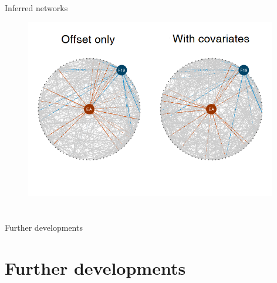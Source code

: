 \documentclass[9pt]{beamer}
\newcommand{\bleu}[1]{\textcolor{Framableulight}{#1}}
\begin{document}
\begin{frame}{Inferred networks}
\begin{figure}[htp]
\centering
\includegraphics[width=11cm]{compare_reseaux.png}

\end{figure}

\end{frame}
\section{}
\subsection{}
\begin{frame}{}
\begin{center}
\huge{\bleu{Further developments}}
\end{center}
\end{frame}

\section{Further developments}
\end{document}
